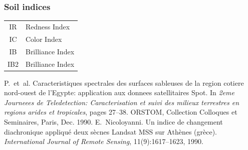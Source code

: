 \documentclass[compress]{beamer}
\begin{document}
\begin{frame}
\frametitle{Soil indices}
\footnotesize \centering
\begin{tabular}{|c|l|}
\hline
IR  & Redness Index  \cite{Pouget1990-IRIC} \\
IC  & Color Index  \cite{Pouget1990-IRIC} \\
IB  & Brilliance Index  \cite{Nicoloyanni1990-IB} \\
IB2 & Brilliance Index  \cite{Nicoloyanni1990-IB} \\
\hline
\end{tabular}
\begin{thebibliography}{noidea}
\tiny
{}
P.~et~al.
 Caracteristiques spectrales des surfaces sableuses de la region
  cotiere nord-ouest de l'{E}gypte: application aux donnees satellitaires
  {S}pot.
 In {\em 2eme Journeees de Teledetection: Caracterisation et suivi des
  milieux terrestres en regions arides et tropicales}, pages 27--38. ORSTOM,
  Collection Colloques et Seminaires, Paris, Dec. 1990.
E.~Nicoloyanni.
 Un indice de changement diachronique appliqu\'e deux s\`ecnes
  {L}andsat {MSS} sur {A}th\`enes (gr\`ece).
 {\em International Journal of Remote Sensing}, 11(9):1617--1623,
  1990.
\end{thebibliography}
\end{frame}
\end{document}
